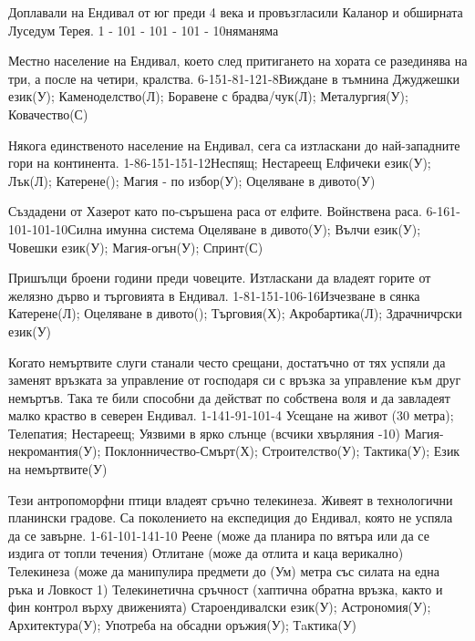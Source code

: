 \begin{multicols}{2}
{Доплавали на Ендивал от юг преди 4 века и провъзгласили Каланор и обширната Луседум Терея.}
{1 - 10}{1 - 10}{1 - 10}{1 - 10}{няма}{няма}

{Местно население на Ендивал, което след притигането на хората се разединява на три, а после на четири, кралства.}
{6-15}{1-8}{1-12}{1-8}{Виждане в тъмнина}
{
Джуджешки език(У);
Каменоделство(Л);
Боравене с брадва/чук(Л);
Металургия(У);
Ковачество(С)
}

{Някога единственото население на Ендивал, сега са изтласкани до най-западните гори на континента.}
{1-8}{6-15}{1-15}{1-12}{Неспящ; Нестареещ}
{
Елфичеки език(У);
Лък(Л);
Катерене();
Магия - по избор(У);
Оцеляване в дивото(У)
}

{Създадени от Хазерот като по-съръшена раса от елфите. Войнствена раса.}
{6-16}{1-10}{1-10}{1-10}{Силна имунна система}
{
Оцеляване в дивото(У);
Вълчи език(У);
Човешки език(У);
Магия-огън(У);
Спринт(С)
}

{Пришълци броени години преди човеците. Изтласкани да владеят горите от желязно дърво и търговията в Ендивал.}
{1-8}{1-15}{1-10}{6-16}{Изчезване в сянка}
{
Катерене(Л);
Оцеляване в дивото();
Търговия(Х);
Акробартика(Л);
Здрачничрски език(У)
}

{Когато немъртвите слуги станали често срещани, достатъчно от тях успяли да заменят връзката за управление от господаря си с връзка за управление към друг немъртъв.
Така те били способни да действат по собствена воля и да завладеят малко краство в северен Ендивал.}
{1-14}{1-9}{1-10}{1-4}
{
Усещане на живот (30 метра);
Телепатия;
Нестареещ;
Уязвими в ярко слънце (всчики хвърляния -10)
}
{
Магия-некромантия(У);
Поклонничество-Смърт(Х);
Строителство(У);
Тактика(У); %
Език на немъртвите(У)
}

{Тези антропоморфни птици владеят сръчно телекинеза.
Живеят в технологични планински градове.
Са поколението на експедиция до Ендивал, която не успяла да се завърне.}
{1-6}{1-10}{1-14}{1-10}
{
Реене (може да планира по вятъра или да се издига от топли течения)
Отлитане (може да отлита и каца верикално)
Телекинеза (може да манипулира предмети до (Ум) метра със силата на една ръка и Ловкост 1)
Телекинетична сръчност (хаптична обратна връзка, както и фин контрол върху движенията)
}
{
Староендивалски език(У);
Астрономия(У);
Архитектура(У);
Употреба на обсадни оръжия(У);
Тaктика(У)
}


\end{multicols}
